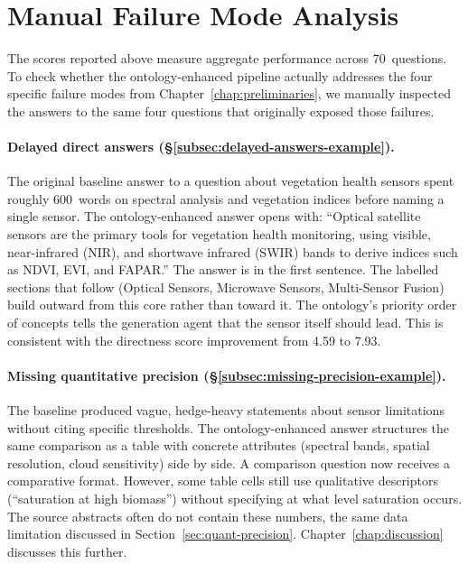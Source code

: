 \section{Manual Failure Mode Analysis}
\label{sec:failure-mode-analysis}

The scores reported above measure aggregate performance across 70~questions. To check whether the ontology-enhanced pipeline actually addresses the four specific failure modes from Chapter~\ref{chap:preliminaries}, we manually inspected the answers to the same four questions that originally exposed those failures.

\paragraph{Delayed direct answers (\S\ref{subsec:delayed-answers-example}).} The original baseline answer to a question about vegetation health sensors spent roughly 600~words on spectral analysis and vegetation indices before naming a single sensor. The ontology-enhanced answer opens with: ``Optical satellite sensors are the primary tools for vegetation health monitoring, using visible, near-infrared (NIR), and shortwave infrared (SWIR) bands to derive indices such as NDVI, EVI, and FAPAR.'' The answer is in the first sentence. The labelled sections that follow (Optical Sensors, Microwave Sensors, Multi-Sensor Fusion) build outward from this core rather than toward it. The ontology's priority order of concepts tells the generation agent that the sensor itself should lead. This is consistent with the directness score improvement from 4.59 to 7.93.

\paragraph{Missing quantitative precision (\S\ref{subsec:missing-precision-example}).} The baseline produced vague, hedge-heavy statements about sensor limitations without citing specific thresholds. The ontology-enhanced answer structures the same comparison as a table with concrete attributes (spectral bands, spatial resolution, cloud sensitivity) side by side. A comparison question now receives a comparative format. However, some table cells still use qualitative descriptors (``saturation at high biomass'') without specifying at what level saturation occurs. The source abstracts often do not contain these numbers, the same data limitation discussed in Section~\ref{sec:quant-precision}. Chapter~\ref{chap:discussion} discusses this further.

